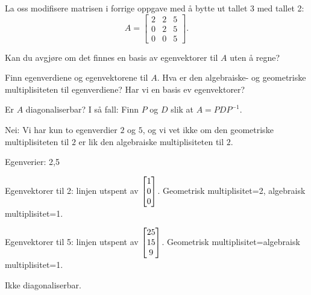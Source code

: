 \begin{oppgave}
La oss modifisere matrisen i forrige oppgave med å bytte ut tallet 3 med tallet 2: $$A=\begin{bmatrix}
2 & 2 & 5\\
0 & 2 & 5\\
0 & 0 & 5
\end{bmatrix}.$$ 

\begin{punkt}
Kan du avgjøre om det finnes en basis av egenvektorer til $A$ uten å regne?
\end{punkt}

\begin{punkt}
Finn egenverdiene og egenvektorene til $A$. Hva er den algebraiske- og geometriske multiplisiteten til egenverdiene? Har vi en basis ev egenvektorer?
\end{punkt}

\begin{punkt}
Er $A$ diagonaliserbar? I så fall: Finn $P$ og $D$ slik at $A=PDP^{-1}$.
\end{punkt}

\end{oppgave}


\begin{losning}
\begin{punkt}
Nei: Vi har kun to egenverdier $2$ og $5$, og vi vet ikke om den geometriske multiplisiteten til $2$ er lik den algebraiske multiplisiteten til $2$.
\end{punkt}

\begin{punkt}
Egenverier: 2,5

\noindent
Egenvektorer til  2: linjen utspent av $\begin{bmatrix} 1 \\ 0 \\ 0 \end{bmatrix}$. Geometrisk multiplisitet=2, algebraisk multiplisitet=1.


\noindent
Egenvektorer til  5: linjen utspent av $\begin{bmatrix} 25 \\ 15 \\ 9 \end{bmatrix}$. Geometrisk multiplisitet=algebraisk multiplisitet=1.


\end{punkt}

Ikke diagonaliserbar.

\end{losning}


